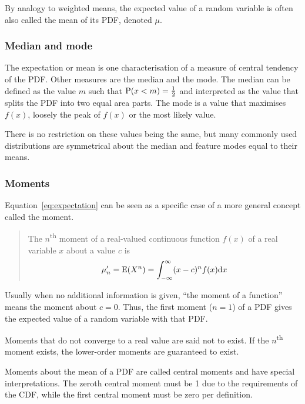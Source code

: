 By analogy to weighted means, the expected value of a random variable is often also called the mean of its PDF, denoted $\mu$.

\subsubsection{Median and mode}
The expectation or mean is one characterisation of a measure of central tendency of the PDF.
Other measures are the median and the mode.
The median can be defined as the value $m$ such that $\mathrm{P}(x<m)=\frac{1}{2}$ and interpreted as the value that splits the PDF into two equal area parts.
The mode is a value that maximises $f(x)$, loosely the peak of $f(x)$ or the most likely value.

There is no restriction on these values being the same, but many commonly used distributions are symmetrical about the median and feature modes equal to their means.


\subsubsection{Moments}
Equation~\ref{eq:expectation} can be seen as a specific case of a more general concept called the moment.
\begin{quote} %
The $n$\textsuperscript{th} moment of a real-valued continuous function $f(x)$ of a real variable $x$ about a value $c$ is
\begin{equation}
\label{eq:moment}
\mu'_n = \mathrm{E}(X^n) = \int_{-\infty}^\infty (x - c)^n f(x) \mathrm{d} x
\end{equation}
\end{quote}

Usually when no additional information is given, ``the moment of a function'' means the moment about $c=0$.
Thus, the first moment ($n=1$) of a PDF gives the expected value of a random variable with that PDF.

Moments that do not converge to a real value are said not to exist.
If the $n$\textsuperscript{th} moment exists, the lower-order moments are guaranteed to exist.\citehere

Moments about the mean of a PDF are called central moments and have special interpretations.  
The zeroth central moment must be 1 due to the requirements of the CDF, while the first central moment must be zero per definition.

